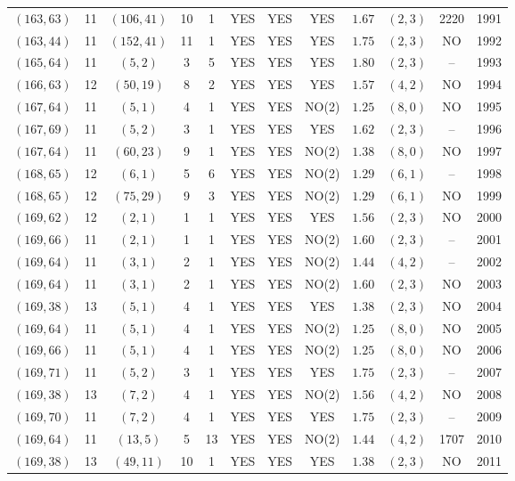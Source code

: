 \begin{longtable}{|c|c|c|c|c|c|c|c|c|c|c|c|}
$(163,63)$ & 11 & $(106,41)$ & 10 & 1 & YES & YES & YES & $1.67$ & $(2,3)$ & 2220 & 1991\\
$(163,44)$ & 11 & $(152,41)$ & 11 & 1 & YES & YES & YES & $1.75$ & $(2,3)$ & NO & 1992\\
$(165,64)$ & 11 & $(5,2)$ & 3 & 5 & YES & YES & YES & $1.80$ & $(2,3)$ & -- & 1993\\
$(166,63)$ & 12 & $(50,19)$ & 8 & 2 & YES & YES & YES & $1.57$ & $(4,2)$ & NO & 1994\\
$(167,64)$ & 11 & $(5,1)$ & 4 & 1 & YES & YES & NO(2) & $1.25$ & $(8,0)$ & NO & 1995\\
$(167,69)$ & 11 & $(5,2)$ & 3 & 1 & YES & YES & YES & $1.62$ & $(2,3)$ & -- & 1996\\
$(167,64)$ & 11 & $(60,23)$ & 9 & 1 & YES & YES & NO(2) & $1.38$ & $(8,0)$ & NO & 1997\\
$(168,65)$ & 12 & $(6,1)$ & 5 & 6 & YES & YES & NO(2) & $1.29$ & $(6,1)$ & -- & 1998\\
$(168,65)$ & 12 & $(75,29)$ & 9 & 3 & YES & YES & NO(2) & $1.29$ & $(6,1)$ & NO & 1999\\
$(169,62)$ & 12 & $(2,1)$ & 1 & 1 & YES & YES & YES & $1.56$ & $(2,3)$ & NO & 2000\\
$(169,66)$ & 11 & $(2,1)$ & 1 & 1 & YES & YES & NO(2) & $1.60$ & $(2,3)$ & -- & 2001\\
$(169,64)$ & 11 & $(3,1)$ & 2 & 1 & YES & YES & NO(2) & $1.44$ & $(4,2)$ & -- & 2002\\
$(169,64)$ & 11 & $(3,1)$ & 2 & 1 & YES & YES & NO(2) & $1.60$ & $(2,3)$ & NO & 2003\\
$(169,38)$ & 13 & $(5,1)$ & 4 & 1 & YES & YES & YES & $1.38$ & $(2,3)$ & NO & 2004\\
$(169,64)$ & 11 & $(5,1)$ & 4 & 1 & YES & YES & NO(2) & $1.25$ & $(8,0)$ & NO & 2005\\
$(169,66)$ & 11 & $(5,1)$ & 4 & 1 & YES & YES & NO(2) & $1.25$ & $(8,0)$ & NO & 2006\\
$(169,71)$ & 11 & $(5,2)$ & 3 & 1 & YES & YES & YES & $1.75$ & $(2,3)$ & -- & 2007\\
$(169,38)$ & 13 & $(7,2)$ & 4 & 1 & YES & YES & NO(2) & $1.56$ & $(4,2)$ & NO & 2008\\
$(169,70)$ & 11 & $(7,2)$ & 4 & 1 & YES & YES & YES & $1.75$ & $(2,3)$ & -- & 2009\\
$(169,64)$ & 11 & $(13,5)$ & 5 & 13 & YES & YES & NO(2) & $1.44$ & $(4,2)$ & 1707 & 2010\\
$(169,38)$ & 13 & $(49,11)$ & 10 & 1 & YES & YES & YES & $1.38$ & $(2,3)$ & NO & 2011\\

\end{longtable}
